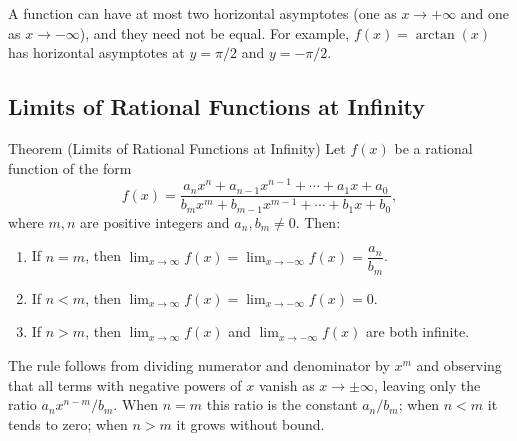 \begin{remark*}
A function can have at most two horizontal asymptotes (one as
$x \to +\infty$ and one as $x \to -\infty$), and they need not
be equal.
For example, $f(x) = \arctan(x)$ has horizontal asymptotes at
$y = \pi/2$ and $y = -\pi/2$.
\end{remark*}

\subsection*{Limits of Rational Functions at Infinity}

\begin{theorembox}{Theorem (Limits of Rational Functions at Infinity)}
Let $f(x)$ be a rational function of the form
\[
  f(x) = \frac{a_n x^n + a_{n-1} x^{n-1} + \cdots + a_1 x + a_0}
              {b_m x^m + b_{m-1} x^{m-1} + \cdots + b_1 x + b_0},
\]
where $m, n$ are positive integers and $a_n, b_m \neq 0$. Then:
\begin{enumerate}
  \item If $n = m$, then
        $\displaystyle\lim_{x \to \infty} f(x)
         = \lim_{x \to -\infty} f(x) = \dfrac{a_n}{b_m}$.

  \item If $n < m$, then
        $\displaystyle\lim_{x \to \infty} f(x)
         = \lim_{x \to -\infty} f(x) = 0$.

  \item If $n > m$, then $\lim_{x \to \infty} f(x)$ and
        $\lim_{x \to -\infty} f(x)$ are both infinite.
\end{enumerate}
\end{theorembox}

\begin{remark*}
The rule follows from dividing numerator and denominator by $x^m$
and observing that all terms with negative powers of $x$ vanish
as $x \to \pm\infty$, leaving only the ratio $a_n x^{n-m} / b_m$.
When $n = m$ this ratio is the constant $a_n/b_m$; when $n < m$
it tends to zero; when $n > m$ it grows without bound.
\end{remark*}